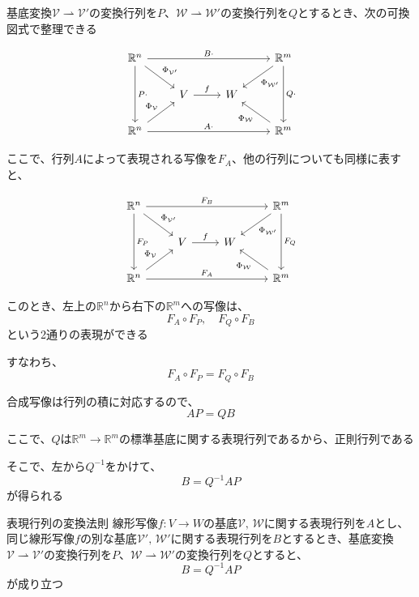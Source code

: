 \documentclass[../../../topic_linear-algebra]{subfiles}
\begin{document}
基底変換$\mathcal{V} \rightharpoonup \mathcal{V}'$の変換行列を$P$、$\mathcal{W} \rightharpoonup \mathcal{W}'$の変換行列を$Q$とするとき、次の可換図式で整理できる

\begin{equation*}
  \begin{tikzcd}
    \mathbb{R}^n \arrow[dd,"P\cdot"] \arrow[rd,"{\Phi_{\mathcal{V}'}}"] \arrow[rrr,"B\cdot"] &&& \mathbb{R}^m \arrow[dd,"Q\cdot"] \arrow[ld,"{\Phi_{\mathcal{W}'}}"] \\
    & V \arrow[r,"f"] & W & \\
    \mathbb{R}^n \arrow[ru,"{\Phi_{\mathcal{V}}}"] \arrow[rrr,"A\cdot"] &&& \mathbb{R}^m \arrow[lu,"{\Phi_{\mathcal{W}}}"]
  \end{tikzcd}
\end{equation*}

ここで、行列$A$によって表現される写像を$F_A$、他の行列についても同様に表すと、

\begin{equation*}
  \begin{tikzcd}
    \mathbb{R}^n \arrow[dd,"F_P"] \arrow[rd,"{\Phi_{\mathcal{V}'}}"] \arrow[rrr,"F_B"] &&& \mathbb{R}^m \arrow[dd,"F_Q"] \arrow[ld,"{\Phi_{\mathcal{W}'}}"] \\
    & V \arrow[r,"f"] & W & \\
    \mathbb{R}^n \arrow[ru,"{\Phi_{\mathcal{V}}}"] \arrow[rrr,"F_A"] &&& \mathbb{R}^m \arrow[lu,"{\Phi_{\mathcal{W}}}"]
  \end{tikzcd}
\end{equation*}

このとき、左上の$\mathbb{R}^n$から右下の$\mathbb{R}^m$への写像は、
\begin{equation*}
  F_A \circ F_P,\quad F_Q \circ F_B
\end{equation*}
という2通りの表現ができる

すなわち、
\begin{equation*}
  F_A \circ F_P = F_Q \circ F_B
\end{equation*}

合成写像は行列の積に対応するので、
\begin{equation*}
  AP = QB
\end{equation*}

ここで、$Q$は$\mathbb{R}^m \to \mathbb{R}^m$の標準基底に関する表現行列であるから、正則行列である

そこで、左から$Q^{-1}$をかけて、
\begin{equation*}
  B = Q^{-1} AP
\end{equation*}
が得られる

\begin{theorem}{表現行列の変換法則}
  線形写像$f\colon V \to W$の基底$\mathcal{V},\, \mathcal{W}$に関する表現行列を$A$とし、同じ線形写像$f$の別な基底$\mathcal{V}',\, \mathcal{W}'$に関する表現行列を$B$とするとき、基底変換$\mathcal{V} \rightharpoonup \mathcal{V}'$の変換行列を$P$、$\mathcal{W} \rightharpoonup \mathcal{W}'$の変換行列を$Q$とすると、
  \begin{equation*}
    B = Q^{-1} A P
  \end{equation*}
  が成り立つ
\end{theorem}
\end{document}
